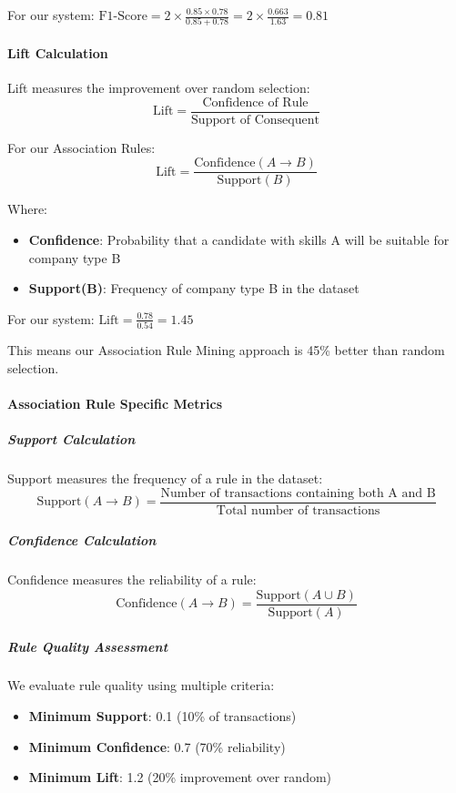 \documentclass[12pt,a4paper]{article}
\begin{document}
For our system: $\text{F1-Score} = 2 \times \frac{0.85 \times 0.78}{0.85 + 0.78} = 2 \times \frac{0.663}{1.63} = 0.81$

\paragraph{Lift Calculation}
Lift measures the improvement over random selection:
\begin{equation}
\text{Lift} = \frac{\text{Confidence of Rule}}{\text{Support of Consequent}}
\end{equation}

For our Association Rules:
\begin{equation}
\text{Lift} = \frac{\text{Confidence}(A \rightarrow B)}{\text{Support}(B)}
\end{equation}

Where:
\begin{itemize}
    \item \textbf{Confidence}: Probability that a candidate with skills A will be suitable for company type B
    \item \textbf{Support(B)}: Frequency of company type B in the dataset
\end{itemize}

For our system: $\text{Lift} = \frac{0.78}{0.54} = 1.45$

This means our Association Rule Mining approach is 45\% better than random selection.

\paragraph{Association Rule Specific Metrics}

\subparagraph{Support Calculation}
Support measures the frequency of a rule in the dataset:
\begin{equation}
\text{Support}(A \rightarrow B) = \frac{\text{Number of transactions containing both A and B}}{\text{Total number of transactions}}
\end{equation}

\subparagraph{Confidence Calculation}
Confidence measures the reliability of a rule:
\begin{equation}
\text{Confidence}(A \rightarrow B) = \frac{\text{Support}(A \cup B)}{\text{Support}(A)}
\end{equation}

\subparagraph{Rule Quality Assessment}
We evaluate rule quality using multiple criteria:
\begin{itemize}
    \item \textbf{Minimum Support}: 0.1 (10\% of transactions)
    \item \textbf{Minimum Confidence}: 0.7 (70\% reliability)
    \item \textbf{Minimum Lift}: 1.2 (20\% improvement over random)
\end{itemize}
\end{document}
